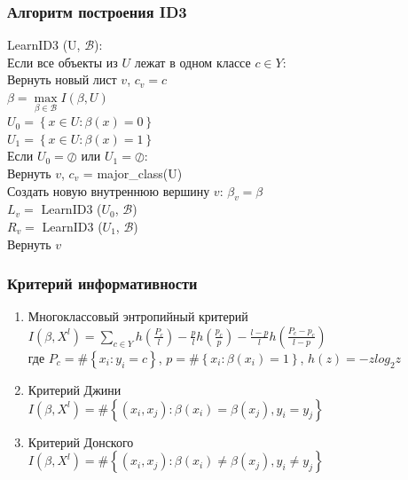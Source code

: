 \documentclass[12pt]{beamer}
\begin{document}
\begin{frame}\frametitle{Алгоритм построения ID3}
LearnID3 (U, $\mathcal{B}$):\\
\hspace{10mm} Если все объекты из $U$ лежат в одном классе $c \in Y$: \\
\hspace{20mm} Вернуть новый лист $v$, $c_v = c$\\
\vspace{3mm}
\hspace{10mm} $\beta = \max\limits_{\beta \in \mathcal{B}} I(\beta, U)$\\
\vspace{3mm}
\hspace{10mm} $U_0 = \left\{ x \in U : \beta(x) = 0\right\}$	\\
\hspace{10mm} $U_1 = \left\{ x \in U : \beta(x) = 1\right\}$	\\
\vspace{3mm}
\hspace{10mm} Если $U_0 = \oslash$ или $U_1 = \oslash$:\\ 
\hspace{20mm} Вернуть $v$, $c_v$ = major\_class(U)\\
\vspace{3mm}
\hspace{10mm} Создать новую внутреннюю вершину $v$: $\beta_v = \beta$\\
\vspace{3mm}
\hspace{10mm} $L_v =$ LearnID3 ($U_0$, $\mathcal{B}$)\\
\hspace{10mm} $R_v =$ LearnID3 ($U_1$, $\mathcal{B}$)\\
\hspace{10mm} Вернуть $v$
\end{frame}

\begin{frame}\frametitle{Критерий информативности}
\begin{enumerate}[--]
\item Многоклассовый энтропийный критерий
$I(\beta,X^l) = \sum\limits_{c \in Y} h(\frac{P_c}{l}) - \frac{p}{l}h(\frac{p_c}{p}) - \frac{l-p}{l}h(\frac{P_c-p_c}{l-p})$\\
где $P_c = \# \left\{ x_i: y_i =c \right\} $, $p = \# \left\{ x_i: \beta(x_i)= 1 \right\} $, $h(z) = -z log_2 z$
\item Критерий Джини\\
$I(\beta,X^l)= \# \left\{ (x_i, x_j): \beta(x_i) = \beta(x_j), y_i = y_j \right\}$
\item Критерий Донского\\
$I(\beta,X^l)= \# \left\{ (x_i, x_j): \beta(x_i) \neq \beta(x_j), y_i \neq y_j \right\}$
\end{enumerate}
\end{frame}
\end{document}
